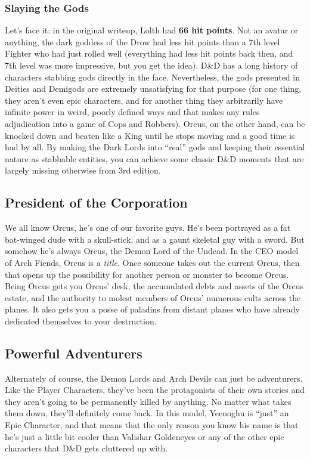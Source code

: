 \subsubsection{Slaying the Gods}

Let's face it: in the original writeup, Lolth had \textbf{66 hit points}. Not an avatar or anything, the dark goddess of the Drow had less hit points than a 7th level Fighter who had just rolled well (everything had less hit points back then, and 7th level was more impressive, but you get the idea). D\&D has a long history of characters stabbing gods directly in the face. Nevertheless, the gods presented in Deities and Demigods are extremely unsatisfying for that purpose (for one thing, they aren't even epic characters, and for another thing they arbitrarily have infinite power in weird, poorly defined ways and that makes any rules adjudication into a game of Cops and Robbers). Orcus, on the other hand, can be knocked down and beaten like a King until he stops moving and a good time is had by all. By making the Dark Lords into ``real'' gods and keeping their essential nature as stabbable entities, you can achieve some classic D\&D moments that are largely missing otherwise from 3rd edition.

\subsection{President of the Corporation}
\vspace*{-8pt}

We all know Orcus, he's one of our favorite guys. He's been portrayed as a fat bat-winged dude with a skull-stick, and as a gaunt skeletal guy with a sword. But somehow he's always Orcus, the Demon Lord of the Undead. In the CEO model of Arch Fiends, Orcus is a \textit{title}. Once someone takes out the current Orcus, then that opens up the possibility for another person or monster to become Orcus. Being Orcus gets you Orcus' desk, the accumulated debts and assets of the Orcus estate, and the authority to molest members of Orcus' numerous cults across the planes. It also gets you a posse of paladins from distant planes who have already dedicated themselves to your destruction.

\subsection{Powerful Adventurers}

Alternately of course, the Demon Lords and Arch Devils can just be adventurers. Like the Player Characters, they've been the protagonists of their own stories and they aren't going to be permanently killed by anything. No matter what takes them down, they'll definitely come back. In this model, Yeenoghu is ``just'' an Epic Character, and that means that the only reason you know his name is that he's just a little bit cooler than Valishar Goldeneyes or any of the other epic characters that D\&D gets cluttered up with.

